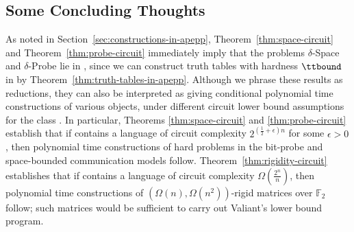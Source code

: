 \subsection{Some Concluding Thoughts} As noted in Section~\ref{sec:constructions-in-apepp}, Theorem~\ref{thm:space-circuit} and Theorem~\ref{thm:probe-circuit} immediately imply that the problems {\sc $\delta$-Space} and {\sc $\delta$-Probe} lie in , since we can construct truth tables with hardness $\ttbound$ in  by Theorem~\ref{thm:truth-tables-in-apepp}. Although we phrase these results as reductions, they can also be interpreted as giving conditional polynomial time constructions of various objects, under different circuit lower bound assumptions for the class . In particular, Theorems \ref{thm:space-circuit} and \ref{thm:probe-circuit} establish that if  contains a language of circuit complexity $2^{(\frac{1}{2} + \epsilon)n}$ for some $\epsilon > 0$, then polynomial time constructions of hard problems in the bit-probe and space-bounded communication models follow. Theorem~\ref{thm:rigidity-circuit} establishes that if  contains a language of circuit complexity $\Omega(\frac{2^n}{n})$, then polynomial time constructions of $(\Omega(n), \Omega(n^2))$-rigid matrices over $\mathbb{F}_2$ follow; such matrices would be sufficient to carry out Valiant's lower bound program.

